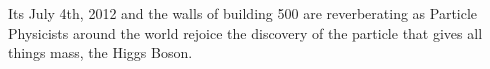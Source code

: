 Its July 4th, 2012 and the walls of building 500 are reverberating as Particle
Physicists around the world rejoice the discovery of the particle that gives all
things mass, the Higgs Boson.
